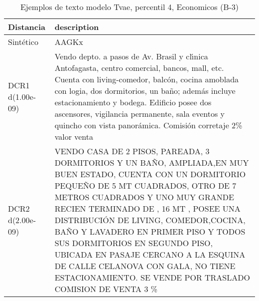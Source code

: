 \begin{table}[H]
\centering
\fontsize{10}{14}\selectfont
\caption{Ejemplos de texto modelo Tvae, percentil 4, Economicos (B-3)}
\label{table-example-economicos-b-3-tvae-4p-text}
\begin{tabular}{|l|m{35em}|}
\hline
\rowcolor[gray]{0.8}
Distancia & description \\
\hline Sintético & AAGKx \\
\hline DCR1 d(1.00e-09) & Vendo depto. a pasos de Av. Brasil y cl{\'\i}nica Antofagasta, centro comercial, bancos, mall, etc. Cuenta con living-comedor, balc\'on, cocina amoblada con logia, dos dormitorios, un ba\~no; adem\'as incluye estacionamiento y bodega. Edificio posee dos ascensores, vigilancia permanente, sala eventos y quincho con vista panor\'amica. Comisi\'on corretaje 2\% valor venta \\
\hline DCR2 d(2.00e-09) & VENDO CASA DE 2 PISOS, PAREADA, 3 DORMITORIOS Y UN BA\~NO, AMPLIADA,EN MUY BUEN ESTADO, CUENTA CON UN DORMITORIO PEQUE\~NO DE 5 MT CUADRADOS, OTRO DE 7 METROS CUADRADOS Y UNO MUY GRANDE RECIEN TERMINADO DE , 16 MT , POSEE UNA DISTRIBUCI\'ON DE LIVING, COMEDOR,COCINA,  BA\~NO Y LAVADERO EN PRIMER PISO Y TODOS SUS DORMITORIOS EN SEGUNDO PISO, UBICADA EN PASAJE CERCANO A LA ESQUINA DE CALLE CELANOVA CON GALA, NO TIENE ESTACIONAMIENTO. SE VENDE POR TRASLADO
COMISION DE VENTA 3 \%
 \\
\hline
\end{tabular}
\end{table}
